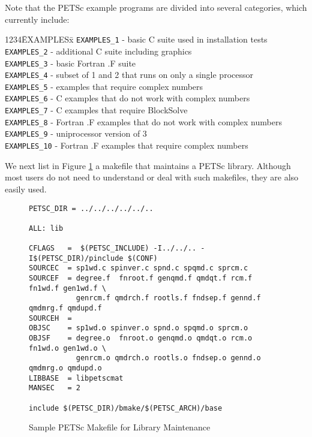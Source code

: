 Note that the PETSc example programs are divided into several
categories, which currently include: 
\begin{tabbing}
1234\= EXAMPLESx\= \kill
\> {\tt EXAMPLES\_1} \> - basic C suite used in installation tests\\
\> {\tt EXAMPLES\_2} \> - additional C suite including graphics\\
\> {\tt EXAMPLES\_3} \> - basic Fortran .F suite\\
\> {\tt EXAMPLES\_4} \> - subset of 1 and 2 that runs on only a single processor\\
\> {\tt EXAMPLES\_5} \> - examples that require complex numbers\\
\> {\tt EXAMPLES\_6} \> - C examples that do not work with complex numbers\\
\> {\tt EXAMPLES\_7} \> - C examples that require BlockSolve\\
\> {\tt EXAMPLES\_8} \> - Fortran .F examples that do not work with complex numbers\\
\> {\tt EXAMPLES\_9} \> - uniprocessor version of 3\\
\> {\tt EXAMPLES\_10} \> - Fortran .F examples that require complex numbers\\
\end{tabbing}

We next list in Figure \ref{fig:make2} a makefile that maintains a PETSc 
library.  Although most users do not need to understand or deal with such
makefiles, they are also easily used.

\begin{figure}[H]
{\small
\begin{verbatim}
PETSC_DIR = ../../../../../..

ALL: lib

CFLAGS   =  $(PETSC_INCLUDE) -I../../.. -I$(PETSC_DIR)/pinclude $(CONF)
SOURCEC  = sp1wd.c spinver.c spnd.c spqmd.c sprcm.c
SOURCEF  = degree.f  fnroot.f genqmd.f qmdqt.f rcm.f fn1wd.f gen1wd.f \
           genrcm.f qmdrch.f rootls.f fndsep.f gennd.f qmdmrg.f qmdupd.f
SOURCEH  = 
OBJSC    = sp1wd.o spinver.o spnd.o spqmd.o sprcm.o
OBJSF    = degree.o  fnroot.o genqmd.o qmdqt.o rcm.o fn1wd.o gen1wd.o \
           genrcm.o qmdrch.o rootls.o fndsep.o gennd.o qmdmrg.o qmdupd.o
LIBBASE  = libpetscmat
MANSEC   = 2

include $(PETSC_DIR)/bmake/$(PETSC_ARCH)/base
\end{verbatim}
}
\caption{Sample PETSc Makefile for Library Maintenance}
\label{fig:make2}
\end{figure}


